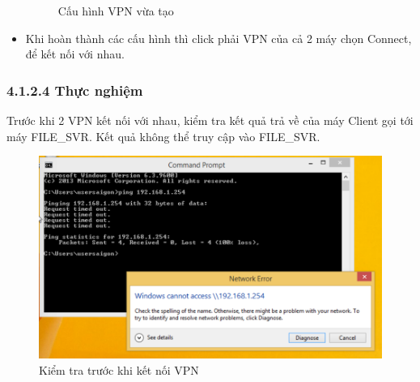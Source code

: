 \begin{itemize}
    \begin{figure}[htbp]
            \hfill
            \hfill
            \caption{Cấu hình VPN vừa tạo}
        \end{figure}
  
        \item Khi hoàn thành các cấu hình thì click phải VPN của cả 2 máy chọn Connect, để kết nối với nhau. 

    \end{itemize}
 \subsubsection*{4.1.2.4 Thực nghiệm}
Trước khi 2 VPN kết nối với nhau, kiểm tra kết quả trả về của máy Client gọi tới máy FILE\_SVR. Kết quả không thể truy cập vào FILE\_SVR.
\newpage
    \begin{figure}[htbp]
        \centering
        \includegraphics[width=0.5\linewidth]{SiteToSiteImg/beforeConnect.png}
        \caption{Kiểm tra trước khi kết nối VPN}
    \end{figure}
    
